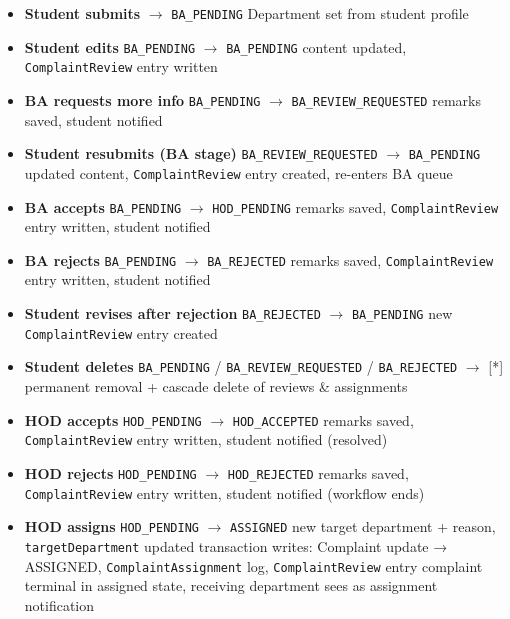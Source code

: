 \begin{itemize}
  \item \textbf{Student submits} $\to$ \texttt{BA\_PENDING}
        \quad Department set from student profile

  \item \textbf{Student edits} \quad \texttt{BA\_PENDING} $\to$ \texttt{BA\_PENDING}
        \quad content updated, \texttt{ComplaintReview} entry written

  \item \textbf{BA requests more info} \quad \texttt{BA\_PENDING} $\to$ \texttt{BA\_REVIEW\_REQUESTED}
        \quad remarks saved, student notified

  \item \textbf{Student resubmits (BA stage)} \quad \texttt{BA\_REVIEW\_REQUESTED} $\to$ \texttt{BA\_PENDING}
        \quad updated content, \texttt{ComplaintReview} entry created, re-enters BA queue

  \item \textbf{BA accepts} \quad \texttt{BA\_PENDING} $\to$ \texttt{HOD\_PENDING}
        \quad remarks saved, \texttt{ComplaintReview} entry written, student notified

  \item \textbf{BA rejects} \quad \texttt{BA\_PENDING} $\to$ \texttt{BA\_REJECTED}
        \quad remarks saved, \texttt{ComplaintReview} entry written, student notified

  \item \textbf{Student revises after rejection} \quad \texttt{BA\_REJECTED} $\to$ \texttt{BA\_PENDING}
        \quad new \texttt{ComplaintReview} entry created

  \item \textbf{Student deletes} \quad \texttt{BA\_PENDING} / \texttt{BA\_REVIEW\_REQUESTED} / \texttt{BA\_REJECTED} $\to$ [*]
        \quad permanent removal + cascade delete of reviews \& assignments

  \item \textbf{HOD accepts} \quad \texttt{HOD\_PENDING} $\to$ \texttt{HOD\_ACCEPTED}
        \quad remarks saved, \texttt{ComplaintReview} entry written, student notified (resolved)

  \item \textbf{HOD rejects} \quad \texttt{HOD\_PENDING} $\to$ \texttt{HOD\_REJECTED}
        \quad remarks saved, \texttt{ComplaintReview} entry written, student notified (workflow ends)

  \item \textbf{HOD assigns} \quad \texttt{HOD\_PENDING} $\to$ \texttt{ASSIGNED}
        \quad new target department + reason, \texttt{targetDepartment} updated
        \quad transaction writes: Complaint update → ASSIGNED, \texttt{ComplaintAssignment} log, \texttt{ComplaintReview} entry
        \quad complaint terminal in assigned state, receiving department sees as assignment notification
\end{itemize}
 

